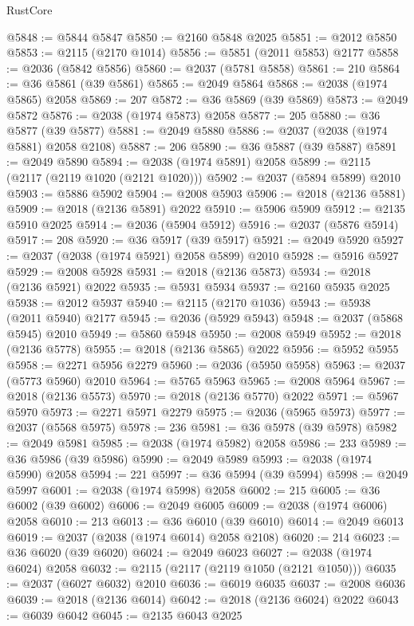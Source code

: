 \begin{lexlean}{RustCore}
\begin{coremodule}
@5848 := @5844 @5847
@5850 := @2160 @5848 @2025
@5851 := @2012 @5850
@5853 := @2115 (@2170 @1014)
@5856 := @5851 (@2011 @5853) @2177
@5858 := @2036 (@5842 @5856)
@5860 := @2037 (@5781 @5858)
@5861 := 210
@5864 := @36 @5861 (@39 @5861)
@5865 := @2049 @5864
@5868 := @2038 (@1974 @5865) @2058
@5869 := 207
@5872 := @36 @5869 (@39 @5869)
@5873 := @2049 @5872
@5876 := @2038 (@1974 @5873) @2058
@5877 := 205
@5880 := @36 @5877 (@39 @5877)
@5881 := @2049 @5880
@5886 := @2037 (@2038 (@1974 @5881) @2058 @2108)
@5887 := 206
@5890 := @36 @5887 (@39 @5887)
@5891 := @2049 @5890
@5894 := @2038 (@1974 @5891) @2058
@5899 := @2115 (@2117 (@2119 @1020 (@2121 @1020)))
@5902 := @2037 (@5894 @5899) @2010
@5903 := @5886 @5902
@5904 := @2008 @5903
@5906 := @2018 (@2136 @5881)
@5909 := @2018 (@2136 @5891) @2022
@5910 := @5906 @5909
@5912 := @2135 @5910 @2025
@5914 := @2036 (@5904 @5912)
@5916 := @2037 (@5876 @5914)
@5917 := 208
@5920 := @36 @5917 (@39 @5917)
@5921 := @2049 @5920
@5927 := @2037 (@2038 (@1974 @5921) @2058 @5899) @2010
@5928 := @5916 @5927
@5929 := @2008 @5928
@5931 := @2018 (@2136 @5873)
@5934 := @2018 (@2136 @5921) @2022
@5935 := @5931 @5934
@5937 := @2160 @5935 @2025
@5938 := @2012 @5937
@5940 := @2115 (@2170 @1036)
@5943 := @5938 (@2011 @5940) @2177
@5945 := @2036 (@5929 @5943)
@5948 := @2037 (@5868 @5945) @2010
@5949 := @5860 @5948
@5950 := @2008 @5949
@5952 := @2018 (@2136 @5778)
@5955 := @2018 (@2136 @5865) @2022
@5956 := @5952 @5955
@5958 := @2271 @5956 @2279
@5960 := @2036 (@5950 @5958)
@5963 := @2037 (@5773 @5960) @2010
@5964 := @5765 @5963
@5965 := @2008 @5964
@5967 := @2018 (@2136 @5573)
@5970 := @2018 (@2136 @5770) @2022
@5971 := @5967 @5970
@5973 := @2271 @5971 @2279
@5975 := @2036 (@5965 @5973)
@5977 := @2037 (@5568 @5975)
@5978 := 236
@5981 := @36 @5978 (@39 @5978)
@5982 := @2049 @5981
@5985 := @2038 (@1974 @5982) @2058
@5986 := 233
@5989 := @36 @5986 (@39 @5986)
@5990 := @2049 @5989
@5993 := @2038 (@1974 @5990) @2058
@5994 := 221
@5997 := @36 @5994 (@39 @5994)
@5998 := @2049 @5997
@6001 := @2038 (@1974 @5998) @2058
@6002 := 215
@6005 := @36 @6002 (@39 @6002)
@6006 := @2049 @6005
@6009 := @2038 (@1974 @6006) @2058
@6010 := 213
@6013 := @36 @6010 (@39 @6010)
@6014 := @2049 @6013
@6019 := @2037 (@2038 (@1974 @6014) @2058 @2108)
@6020 := 214
@6023 := @36 @6020 (@39 @6020)
@6024 := @2049 @6023
@6027 := @2038 (@1974 @6024) @2058
@6032 := @2115 (@2117 (@2119 @1050 (@2121 @1050)))
@6035 := @2037 (@6027 @6032) @2010
@6036 := @6019 @6035
@6037 := @2008 @6036
@6039 := @2018 (@2136 @6014)
@6042 := @2018 (@2136 @6024) @2022
@6043 := @6039 @6042
@6045 := @2135 @6043 @2025

\end{coremodule}
\end{lexlean}
